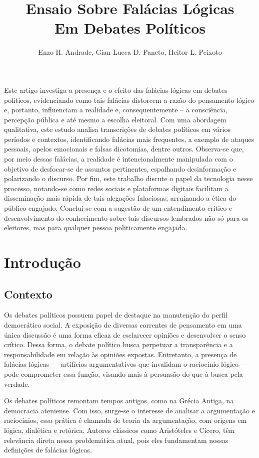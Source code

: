 \documentclass[12pt]{article}
\title{Ensaio Sobre Falácias Lógicas\\ Em Debates Políticos}
\author{Enzo H. Andrade\inst{1}, Gian Lucca D. Paneto\inst{2}, Heitor L. Peixoto
\inst{3}}
\begin{document}
 

\maketitle


\begin{resumo} 
  Este artigo investiga a presença e o efeito das falácias lógicas em debates políticos, evidenciando como tais falácias distorcem a razão do pensamento lógico e, portanto, influenciam a realidade e, consequentemente – a consciência, percepção pública e até mesmo a escolha eleitoral. Com uma abordagem qualitativa, este estudo analisa transcrições de debates políticos em vários períodos e contextos, identificando falácias mais frequentes, a exemplo de ataques pessoais, apelos emocionais e falsas dicotomias, dentre outros. Observa-se que, por meio dessas falácias, a realidade é intencionalmente manipulada com o objetivo de desfocar-se de assuntos pertinentes, espalhando desinformação e polarizando o discurso. Por fim, este trabalho discute o papel da tecnologia nesse processo, notando-se como redes sociais e plataformas digitais facilitam a disseminação mais rápida de tais alegações falaciosas, arruinando a ética do público engajado. Conclui-se com a sugestão de um entendimento crítico e desenvolvimento do conhecimento sobre tais discursos lembrados não só para os eleitores, mas para qualquer pessoa politicamente engajada.
\end{resumo}


\section{Introdução}
\subsection{Contexto}
Os debates políticos possuem papel de destaque na manutenção do perfil democrático social. A exposição de diversas correntes de pensamento em uma única discussão é uma forma eficaz de esclarecer opiniões e desenvolver o senso crítico. Dessa forma, o debate político busca perpetuar a transparência e a responsabilidade em relação às opiniões expostas. Entretanto, a presença de falácias lógicas — artifícios argumentativos que invalidam o raciocínio lógico — \cite{Domina:1} pode comprometer essa função, visando mais à persuasão do que à busca pela verdade. 

Os debates políticos remontam tempos antigos, como na Grécia Antiga, na democracia ateniense. Com isso, surge-se o interesse de analisar a argumentação e raciocínios, essa prática é chamada de teoria da argumentação, com origens em lógica, dialética e retórica. Autores clássicos como Aristóteles e Cícero, têm relevância direta nessa problemática atual, pois eles fundamentam nossas definições de falácias lógicas.
\end{document}

